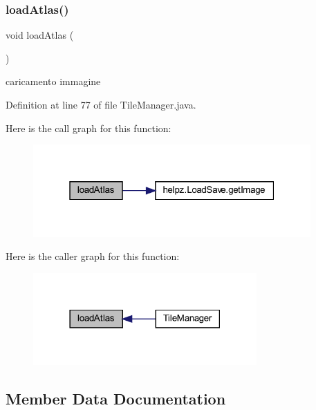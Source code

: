 \subsubsection{\texorpdfstring{load\+Atlas()}{loadAtlas()}}
{\footnotesize\ttfamily void load\+Atlas (\begin{DoxyParamCaption}{ }\end{DoxyParamCaption})\hspace{0.3cm}{\ttfamily [private]}}



caricamento immagine 



Definition at line 77 of file Tile\+Manager.\+java.

Here is the call graph for this function\+:\nopagebreak
\begin{figure}[H]
\begin{center}
\leavevmode
\includegraphics[width=301pt]{classmanagers_1_1_tile_manager_afc6b9f4a25216ec36baa6e7518a7501a_cgraph}
\end{center}
\end{figure}
Here is the caller graph for this function\+:\nopagebreak
\begin{figure}[H]
\begin{center}
\leavevmode
\includegraphics[width=242pt]{classmanagers_1_1_tile_manager_afc6b9f4a25216ec36baa6e7518a7501a_icgraph}
\end{center}
\end{figure}


\subsection{Member Data Documentation}
\mbox{\label{classmanagers_1_1_tile_manager_a0f6db27994c397bfb9bb56d539707c02}} 
